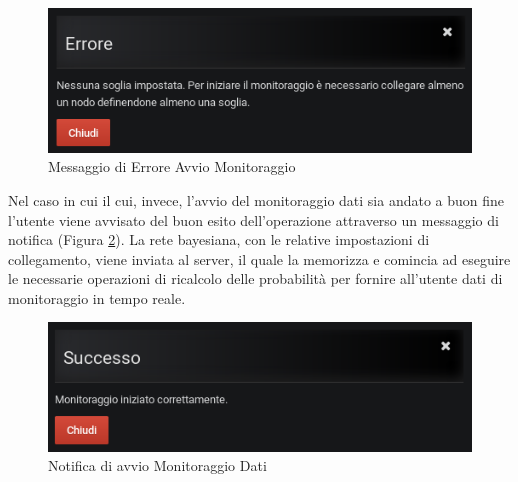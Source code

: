 \begin{figure}[H]
	\begin{center}
		\includegraphics[scale=0.6]{./images/ErroreAvvio.png}
		 \caption{Messaggio di Errore Avvio Monitoraggio}	
		 \label{ErroreAvvio}
	\end{center}
\end{figure}

Nel caso in cui il cui, invece, l'avvio del monitoraggio dati sia andato a buon fine l'utente viene avvisato del buon esito dell'operazione attraverso un messaggio di notifica (Figura \ref{NotificaMonitoraggio}). La rete bayesiana, con le relative impostazioni di collegamento, viene inviata al server, il quale la memorizza e comincia ad eseguire le necessarie operazioni di ricalcolo delle probabilità per fornire all'utente dati di monitoraggio in tempo reale.

\begin{figure}[H]
	\begin{center}
		\includegraphics[scale=0.6]{./images/NotificaMonitoraggio.png}
		 \caption{Notifica di avvio Monitoraggio Dati}	
		 \label{NotificaMonitoraggio}
	\end{center}
\end{figure}


